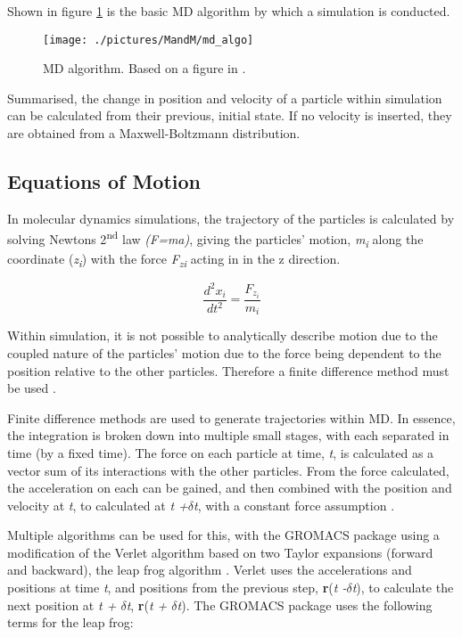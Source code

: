 Shown in figure \ref{fig:md_algo} is the basic MD algorithm by which a simulation is conducted.

\begin{figure}[H]
\begin{center}
\texttt{[image: ./pictures/MandM/md\_algo]}
\caption[MD algorithm] {MD algorithm. Based on a figure in \cite{Apol2013}.}
\label{fig:md_algo}
\end{center}
\end{figure}

Summarised, the change in position and velocity of a particle within simulation can be calculated from their previous, initial state. If no velocity is inserted, they are obtained from a Maxwell-Boltzmann distribution.  


\subsection{Equations of Motion}
In molecular dynamics simulations, the trajectory of the particles is calculated by solving Newtons 2\textsuperscript{nd} law \textit{(F=ma)}, giving the particles' motion, \textit{m\textsubscript{i}} along the coordinate (\textit{z\textsubscript{i}}) with the force \textit{F\textsubscript{zi}} acting in in the z direction.  

\begin{equation}
\frac{d^{2}x_{i}}{dt^{2}}= \frac{F_{z_{i}}}{m_{i}}
\label{eq:newton_2nd}
\end{equation}

Within simulation, it is not possible to analytically describe motion due to the coupled nature of the particles' motion due to the force being dependent to the position relative to the other particles. Therefore a finite difference method must be used \cite{Leach2001}.

Finite difference methods are used to generate trajectories within MD. In essence, the integration is broken down into multiple small stages, with each separated in time (by a fixed time). The force on each particle at time, \textit{t}, is calculated as a vector sum of its interactions with the other particles. From the force calculated, the acceleration on each can be gained, and then combined with the position and velocity at \textit{t}, to calculated at \textit{t +$\delta$t}, with a constant force assumption \cite{Leach2001}.

Multiple algorithms can be used for this, with the GROMACS package using a modification of the Verlet algorithm based on two Taylor expansions (forward and backward), the leap frog algorithm \cite{Hockney1974}. Verlet uses the accelerations and positions at time \textit{t}, and positions from the previous step, \textbf{r}(\textit{t -$\delta$t}), to calculate the next position at \textit{t + $\delta$t}, \textbf{r}(\textit{t + $\delta$t}). The GROMACS package uses the following terms for the leap frog:

